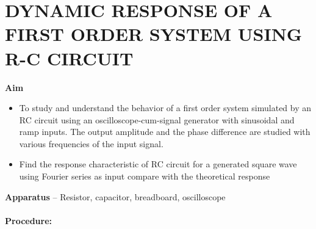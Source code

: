 \documentclass[9pt]{scrreprt}
\begin{document}
\section*{\normalsize DYNAMIC RESPONSE OF A FIRST ORDER SYSTEM USING R-C CIRCUIT}
\textbf{Aim}

\begin{itemize}
\item To study and understand the behavior of a first order system simulated by an RC circuit using an oscilloscope-cum-signal generator with sinusoidal and ramp inputs. The output amplitude and the phase difference are studied with various frequencies of the input signal.
\item Find the response characteristic of RC circuit for a generated square wave using Fourier series as input compare with the theoretical response
\end{itemize} 
\textbf{Apparatus} – Resistor, capacitor, breadboard, oscilloscope\\
\\
\textbf{Procedure:}
\end{document}
